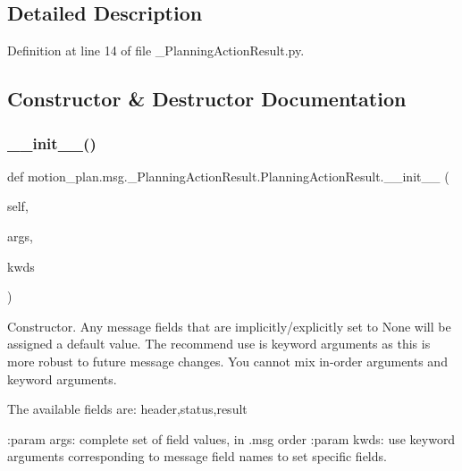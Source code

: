 \subsection{Detailed Description}


Definition at line 14 of file \+\_\+\+Planning\+Action\+Result.\+py.



\subsection{Constructor \& Destructor Documentation}
\mbox{\label{classmotion__plan_1_1msg_1_1__PlanningActionResult_1_1PlanningActionResult_aa9950e0fa2e18032c9409356fe153c56}} 
\subsubsection{\texorpdfstring{\+\_\+\+\_\+init\+\_\+\+\_\+()}{\_\_init\_\_()}}
{\footnotesize\ttfamily def motion\+\_\+plan.\+msg.\+\_\+\+Planning\+Action\+Result.\+Planning\+Action\+Result.\+\_\+\+\_\+init\+\_\+\+\_\+ (\begin{DoxyParamCaption}\item[{}]{self,  }\item[{}]{args,  }\item[{}]{kwds }\end{DoxyParamCaption})}

\begin{DoxyVerb}Constructor. Any message fields that are implicitly/explicitly
set to None will be assigned a default value. The recommend
use is keyword arguments as this is more robust to future message
changes.  You cannot mix in-order arguments and keyword arguments.

The available fields are:
   header,status,result

:param args: complete set of field values, in .msg order
:param kwds: use keyword arguments corresponding to message field names
to set specific fields.
\end{DoxyVerb}
 

